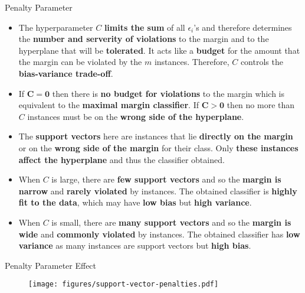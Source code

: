 \documentclass[document.tex]{subfiles}
\begin{document}
    \begin{frame}{Penalty Parameter}
        \begin{itemize}
            \item The hyperparameter $C$ \textbf{limits the sum} of all $\epsilon_i$'s and therefore determines the \textbf{number and serverity of violations} to the margin and to the hyperplane that will be \textbf{tolerated}. It acts like a \textbf{budget} for the amount that the margin can be violated by the $m$ instances. Therefore, $C$ controls the \textbf{bias-variance trade-off}. 
            \item If $\boldsymbol{C = 0}$ then there is \textbf{no budget for violations} to the margin which is equivalent to the \textbf{maximal margin classifier}. If $\boldsymbol{C > 0}$ then no more than $C$ instances must be on the\textbf{ wrong side of the hyperplane}.
            \item The \textbf{support vectors} here are instances that lie \textbf{directly on the margin} or on the \textbf{wrong side of the margin} for their class. Only \textbf{these instances affect the hyperplane} and thus the classifier obtained.
            \item When $C$ is large, there are \textbf{few support vectors} and so the \textbf{margin is narrow} and \textbf{rarely violated} by instances. The obtained classifier is \textbf{highly fit to the data}, which may have \textbf{low bias} but \textbf{high variance}.
            \item When $C$ is small, there are \textbf{many support vectors} and so the \textbf{margin is wide} and \textbf{commonly violated} by instances. The obtained classifier has \textbf{low variance} as many instances are support vectors but \textbf{high bias}.
        \end{itemize}
    \end{frame}

    \begin{frame}{Penalty Parameter Effect}
        \begin{figure}
            \label{fig:support-vector-penalties}
            \texttt{[image: figures/support-vector-penalties.pdf]}
        \end{figure}
    \end{frame}
    
\end{document}
